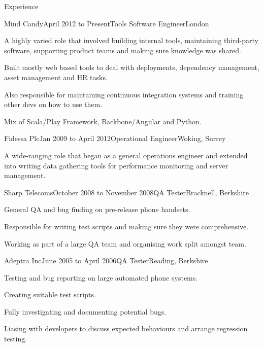 \documentclass{resume} %
\begin{document}

\begin{rSection}{Experience}

  \begin{rExperience}{Mind Candy}{April 2012 to Present}{Tools Software Engineer}{London}
  \item A highly varied role that involved building internal tools, maintaining third-party software, supporting product teams and making sure knowledge was shared.
  \item Built mostly web based tools to deal with deployments, dependency management, asset management and HR tasks.
  \item Also responsible for maintaining continuous integration systems and training other devs on how to use them.
  \item Mix of Scala/Play Framework, Backbone/Angular and Python.
  \end{rExperience}


  \begin{rExperience}{Fidessa Plc}{Jan 2009 to April 2012}{Operational Engineer}{Woking, Surrey}
  \item A wide-ranging role that began as a general operations engineer and extended into writing data gathering tools for performance monitoring and server management.
  \end{rExperience}


  \begin{rExperience}{Sharp Telecoms}{October 2008 to November 2008}{QA Tester}{Bracknell, Berkshire}
  \item General QA and bug finding on pre-release phone handsets.
  \item Responsible for writing test scripts and making sure they were comprehensive.
  \item Working as part of a large QA team and organising work split amongst team.
  \end{rExperience}


  \begin{rExperience}{Adeptra Inc}{June 2005 to April 2006}{QA Tester}{Reading, Berkshire}
  \item Testing and bug reporting on large automated phone systems.
  \item Creating suitable test scripts.
  \item Fully investigating and documenting potential bugs.
  \item Liasing with developers to discuss expected behaviours and arrange regression testing.
  \end{rExperience}

\end{rSection}
\end{document}

